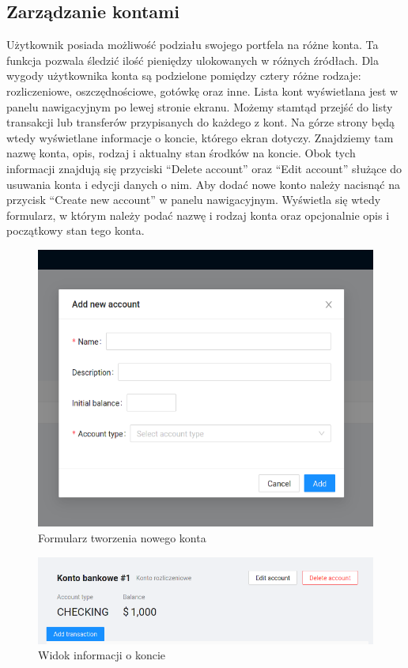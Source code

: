\documentclass[shortabstract,inz]{iithesis}
\begin{document}
\subsection{Zarządzanie kontami}
Użytkownik posiada możliwość podziału swojego portfela na różne konta. Ta funkcja pozwala śledzić ilość pieniędzy ulokowanych w różnych źródłach. Dla wygody użytkownika konta są podzielone pomiędzy cztery różne rodzaje: rozliczeniowe, oszczędnościowe, gotówkę oraz inne. Lista kont wyświetlana jest w panelu nawigacyjnym po lewej stronie ekranu. Możemy stamtąd przejść do listy transakcji lub transferów przypisanych do każdego z kont. Na górze strony będą wtedy wyświetlane informacje o koncie, którego ekran dotyczy. Znajdziemy tam nazwę konta, opis, rodzaj i aktualny stan środków na koncie. Obok tych informacji znajdują się przyciski ``Delete account'' oraz ``Edit account'' służące do usuwania konta i edycji danych o nim. Aby dodać nowe konto należy nacisnąć na przycisk ``Create new account'' w panelu nawigacyjnym. Wyświetla się wtedy formularz, w którym należy podać nazwę i rodzaj konta oraz opcjonalnie opis i początkowy stan tego konta.
\begin{figure}
	\centering
	\includegraphics[scale=0.7]{screen-new-account.png}
	\caption{Formularz tworzenia nowego konta}
	\label{fig:screen-new-account}
\end{figure}
\begin{figure}
	\centering
	\includegraphics[scale=0.7]{screen-panel-info-konto.png}
	\caption{Widok informacji o koncie}
	\label{fig:screen-account-info}
\end{figure}
\end{document}
